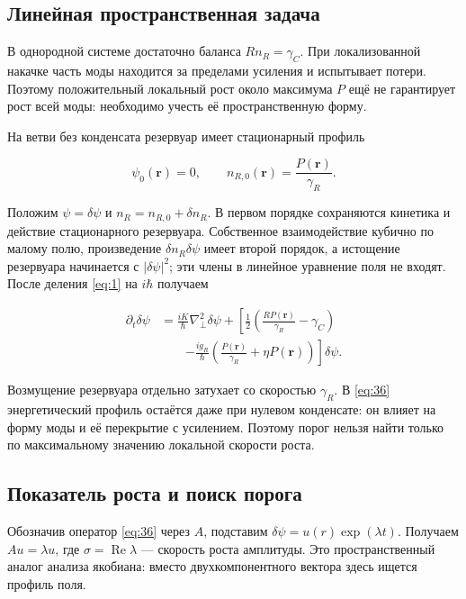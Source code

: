 \documentclass[12pt,a4paper]{article}
\begin{document}
\subsection{Линейная пространственная задача}\label{sec:8.1}

В однородной системе достаточно баланса $R n_{R}=\gamma_{C}$. При локализованной накачке часть моды находится за пределами усиления и испытывает потери. Поэтому положительный локальный рост около максимума $P$ ещё не гарантирует рост всей моды: необходимо учесть её пространственную форму.

На ветви без конденсата резервуар имеет стационарный профиль

\begin{equation}\label{eq:35}
\psi_0(\mathbf r)=0,\qquad n_{R,0}(\mathbf r)=\frac{P(\mathbf r)}{\gamma_R}.\end{equation}

Положим $\psi=\delta \psi$ и $n_{R}=n_{R,0}+\delta n_{R}$. В первом порядке сохраняются кинетика и действие стационарного резервуара. Собственное взаимодействие кубично по малому полю, произведение $\delta n_{R} \delta \psi$ имеет второй порядок, а истощение резервуара начинается с $|\delta \psi|^{2}$; эти члены в линейное уравнение поля не входят. После деления \eqref{eq:1} на $i \hbar$ получаем

\begin{equation}\label{eq:36}
\begin{aligned}
\partial_t\delta\psi
&=\frac{iK}{\hbar}\nabla_\perp^2\delta\psi
+\left[\frac12\left(\frac{RP(\mathbf r)}{\gamma_R}-\gamma_C\right)\right.\\
&\qquad\left.-\frac{ig_R}{\hbar}\left(\frac{P(\mathbf r)}{\gamma_R}+\eta P(\mathbf r)\right)\right]\delta\psi.
\end{aligned}\end{equation}

Возмущение резервуара отдельно затухает со скоростью $\gamma_{R}$. В \eqref{eq:36} энергетический профиль остаётся даже при нулевом конденсате: он влияет на форму моды и её перекрытие с усилением. Поэтому порог нельзя найти только по максимальному значению локальной скорости роста.

\subsection{Показатель роста и поиск порога}\label{sec:8.2}

Обозначив оператор \eqref{eq:36} через $A$, подставим $\delta \psi=u(r)\exp(\lambda t)$. Получаем $A u=\lambda u$, где $\sigma=\operatorname{Re} \lambda$ --- скорость роста амплитуды. Это пространственный аналог анализа якобиана: вместо двухкомпонентного вектора здесь ищется профиль поля.
\end{document}
